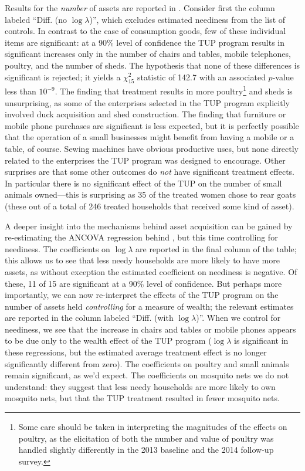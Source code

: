 \documentclass[12pt,letterpaper]{article}
\begin{document}
Results for the \emph{number} of assets are reported in
.  Consider first the column labeled
``Diff. (no \(\log\lambda\))'', which excludes estimated neediness from
the list of controls.  In contrast to the case of consumption goods,
few of these individual items are significant: at a 90\% level of
confidence the TUP program results in significant increases only in
the number of chairs and tables, mobile telephones, poultry, and the
number of sheds.  The hypothesis that none of these differences is
significant is rejected; it yields a \(\chi^2_{15}\) statistic of 142.7
with an associated \(p\)-value less than \(10^{-9}\).  The finding that
treatment results in more poultry\footnote{Some care should be taken in
interpreting the magnitudes of the effects on poultry, as the
elicitation of both the number and value of poultry was handled
slightly differently in the 2013 baseline and the 2014 follow-up
survey.} and sheds is unsurprising, as some of the enterprises
selected in the TUP program explicitly involved duck acquisition and
shed construction.  The finding that furniture or mobile phone
purchases are significant is less expected, but it is perfectly
possible that the operation of a small businesses might benefit from
having a mobile or a table, of course.  Sewing machines have obvious
productive uses, but none directly related to the enterprises the TUP
program was designed to encourage.  Other surprises are that some
other outcomes do \emph{not} have significant treatment effects.  In
particular there is no significant effect of the TUP on the number of
small animals owned---this is surprising as 35 of the treated women
chose to rear goats (these out of a total of 246 treated households
that received some kind of asset).

A deeper insight into the mechanisms behind asset acquisition can be
gained by re-estimating the ANCOVA regression behind
, but this time controlling for neediness.
The coefficients on \(\log\lambda\) are reported in the final column of
the table; this allows us to see that less needy households are more
likely to have more assets, as without exception the estimated
coefficient on neediness is negative.  Of these, 11 of 15 are
significant at a 90\% level of confidence.  But perhaps more
importantly, we can now re-interpret the effects of the TUP program on
the number of assets held \emph{controlling} for a measure of wealth; the
relevant estimates are reported in the column labeled ``Diff. (with
\(\log\lambda\))''.  When we control for neediness, we see that the
increase in chairs and tables or mobile phones appears to be due only
to the wealth effect of the TUP program (\(\log\lambda\) is significant
in these regressions, but the estimated average treatment effect is no
longer significantly different from zero).  The coefficients on
poultry and small animals remain significant, as we'd expect.  The
coefficients on mosquito nets we do not understand: they suggest that
less needy households are more likely to own mosquito nets, but that
the TUP treatment resulted in fewer mosquito nets. 
\end{document}

